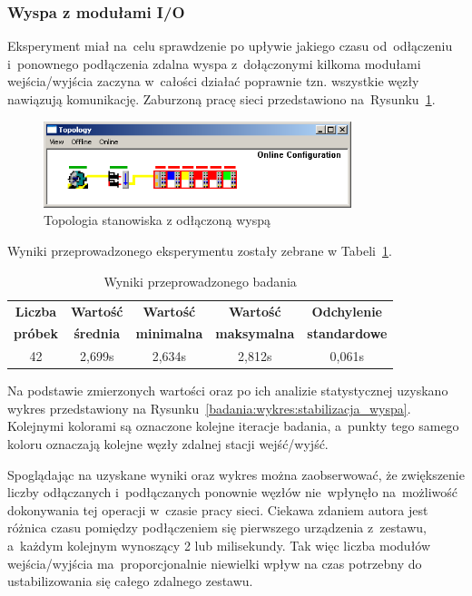 \subsubsection{Wyspa z modułami I/O}
Eksperyment miał na~celu sprawdzenie po upływie jakiego czasu od~odłączeniu i~ponownego podłączenia zdalna wyspa z~dołączonymi kilkoma modułami wejścia/wyjścia zaczyna w~całości działać poprawnie tzn. wszystkie węzły nawiązują komunikację. Zaburzoną pracę sieci przedstawiono na~Rysunku~\ref{coupler}.
\begin{figure}[!htb] 	\centering 	\includegraphics[width=0.8\textwidth]{images/topologyCPerror} \caption{Topologia stanowiska z odłączoną wyspą} \label{coupler} \end{figure}

Wyniki przeprowadzonego eksperymentu zostały zebrane w Tabeli~\ref{badania:wyniki:stabilizacja_wyspa}.
\begin{table}[!htb]
\begin{center}
\begin{tabular}{| c | c | c | c | c |}\hline
\textbf{Liczba} & \textbf{Wartość} & \textbf{Wartość} & \textbf{Wartość} & \textbf{Odchylenie} \\
\textbf{próbek} & \textbf{średnia} & \textbf{minimalna} & \textbf{maksymalna} & \textbf{standardowe} \\\hline\hline
42 & 2,699s & 2,634s & 2,812s & 0,061s \\\hline
\end{tabular}
\end{center}
\vspace*{-6mm}
  \caption{Wyniki przeprowadzonego badania}
	\label{badania:wyniki:stabilizacja_wyspa}
\end{table}

Na podstawie zmierzonych wartości oraz po ich analizie statystycznej uzyskano wykres przedstawiony na Rysunku~\ref{badania:wykres:stabilizacja_wyspa}. Kolejnymi kolorami są oznaczone kolejne iteracje badania, a~punkty tego samego koloru oznaczają kolejne węzły zdalnej stacji wejść/wyjść.


Spoglądając na uzyskane wyniki oraz wykres można zaobserwować, że zwiększenie liczby odłączanych i~podłączanych ponownie węzłów nie~wpłynęło na~możliwość dokonywania tej operacji w~czasie pracy sieci. Ciekawa zdaniem autora jest różnica czasu pomiędzy podłączeniem się pierwszego urządzenia z~zestawu, a~każdym kolejnym wynoszący 2 lub milisekundy. Tak więc liczba modułów wejścia/wyjścia ma~proporcjonalnie niewielki wpływ na czas potrzebny do ustabilizowania się całego zdalnego zestawu.

